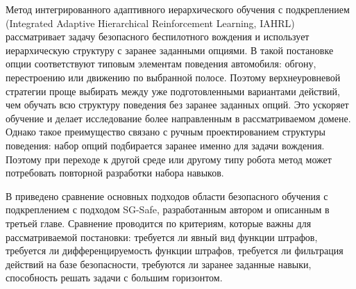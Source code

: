 Метод интегрированного адаптивного иерархического обучения с подкреплением (Integrated Adaptive Hierarchical Reinforcement Learning, IAHRL)~\cite{iahrl} рассматривает задачу безопасного беспилотного вождения и использует иерархическую структуру с заранее заданными опциями. В такой постановке опции соответствуют типовым элементам поведения автомобиля: обгону, перестроению или движению по выбранной полосе. Поэтому верхнеуровневой стратегии проще выбирать между уже подготовленными вариантами действий, чем обучать всю структуру поведения без заранее заданных опций. Это ускоряет обучение и делает исследование более направленным в рассматриваемом домене. Однако такое преимущество связано с ручным проектированием структуры поведения: набор опций подбирается заранее именно для задачи вождения. Поэтому при переходе к другой среде или другому типу робота метод может потребовать повторной разработки набора навыков.

В  приведено сравнение основных подходов области безопасного обучения с подкреплением с подходом SG-Safe, разработанным автором и описанным в третьей главе. Сравнение проводится по критериям, которые важны для рассматриваемой постановки: требуется ли явный вид функции штрафов, требуется ли дифференцируемость функции штрафов, требуется ли фильтрация действий на базе безопасности, требуются ли заранее заданные навыки, способность решать задачи с большим горизонтом.

